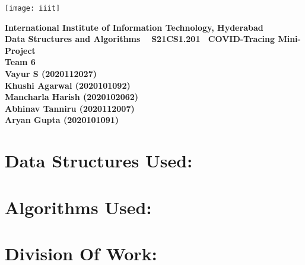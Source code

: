 \documentclass{article}
\begin{document}
\begin{titlepage}

\centering
\vfill
\texttt{[image: iiit]}
\vskip1cm

{\bfseries\Large
		International Institute of Information Technology, Hyderabad\\
        \vskip1cm
        Data Structures and Algorithms \
        \vskip1cm
        S21CS1.201\
        \vskip2cm
        COVID-Tracing Mini-Project\\
        \vskip2cm
       Team 6}\\
        \vskip 1cm
{\bfseries        
        Vayur S (2020112027)\\
        \vskip 0.5cm
        Khushi Agarwal (2020101092)\\
        \vskip 0.5cm
        Mancharla Harish (2020102062)\\
        \vskip 0.5cm
        Abhinav Tanniru (2020112007)\\
        \vskip 0.5cm
        Aryan Gupta (2020101091)}
    


\end{titlepage}
\newpage

\section{Data Structures Used:}


\newpage
\section{Algorithms Used:}


\newpage
\section{Division Of Work:}
\end{document}
